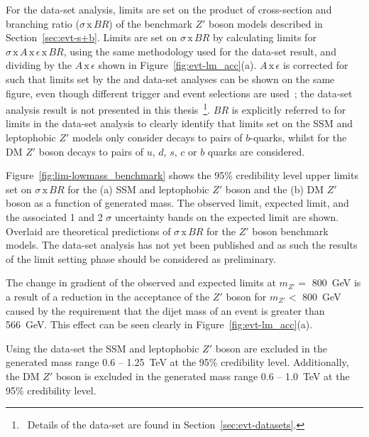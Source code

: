 For the \lm{} data-set analysis, limits are set on the product of cross-section and branching ratio ($\sigma\,\text{x}\,\mathit{BR}$)
of the benchmark $Z'$ boson models described in Section~\ref{sec:evt-s+b}.
Limits are set on $\sigma\,\text{x}\,\mathit{BR}$ by calculating limits for $\sigma\,\text{x}\,\mathit{A}\,\text{x}\,\epsilon\,\text{x}\,\mathit{BR}$,
using the same methodology used for the \summer{} data-set result,
and dividing by the $\mathit{A}\,\text{x}\,\epsilon$ shown in Figure~\ref{fig:evt-lm_acc}(a).
$\mathit{A}\,\text{x}\,\epsilon$ is corrected for such that limits set by the \lm{} and \hm{} data-set analyses can be shown on the same figure,
even though different trigger and event selections are used~\cite{dibjet-full}; the \hm{} data-set analysis result is not presented in this thesis~\footnote{\ Details
  of the \hm{} data-set are found in Section~\ref{sec:evt-datasets}.}.
$\mathit{BR}$ is explicitly referred to for limits in the \lm{} data-set analysis to clearly identify that
limits set on the SSM and leptophobic $Z'$ models only consider decays to pairs of $b$-quarks,
whilst for the DM $Z'$ boson decays to pairs of $u$, $d$, $s$, $c$ or $b$ quarks are considered.

Figure~\ref{fig:lim-lowmass_benchmark} shows the
95\% credibility level upper limits set on $\sigma\,\text{x}\,\mathit{BR}$
for the (a) SSM and leptophobic $Z'$ boson
and the (b)  DM $Z'$ boson as a function of generated mass.
The observed limit, expected limit, and the associated 1 and 2 $\sigma$ uncertainty bands on the expected limit are shown.
Overlaid are theoretical predictions of $\sigma\,\text{x}\,\mathit{BR}$ for the
$Z'$ boson benchmark models.
The \lm{} data-set analysis has not yet been published and as such the results of the limit setting phase should be considered as preliminary.

The change in gradient of the observed and expected limits at $m_{Z'} =$ 800~GeV
is a result of a reduction in the acceptance of the $Z'$ boson for $m_{Z'} <$ 800~GeV
caused by the requirement that the dijet mass of an event is greater than 566~GeV.
This effect can be seen clearly in Figure~\ref{fig:evt-lm_acc}(a).

Using the \lm{} data-set the SSM and leptophobic $Z'$ boson are
excluded in the generated mass range 0.6 -- 1.25~TeV at the 95\% credibility level.
Additionally, the DM $Z'$ boson is excluded in the generated mass range
0.6 -- 1.0~TeV  at the 95\% credibility level.

